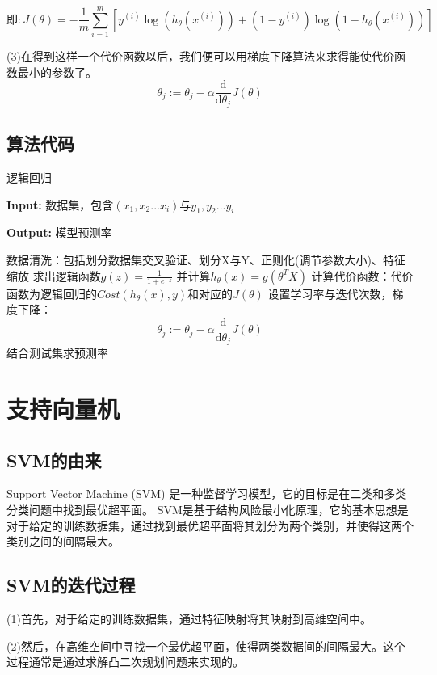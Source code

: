 \documentclass[supercite]{Experimental_Report}
\theoremstyle{definition}
\begin{document}
$$
即:  J(\theta)=-\frac{1}{m} \sum_{i=1}^{m}\left[y^{(i)} \log \left(h_{\theta}\left(x^{(i)}\right)\right)+\left(1-y^{(i)}\right) \log \left(1-h_{\theta}\left(x^{(i)}\right)\right)\right] 
$$

(3)在得到这样一个代价函数以后，我们便可以用梯度下降算法来求得能使代价函数最小的参数了。
 $$ \theta_j:= \theta_j-α\frac{\mathrm{d}}{\mathrm{d}\theta_j}J(\theta) 
$$

\clearpage
\subsection{算法代码}
\begin{algorithm}[htb]
\caption{逻辑回归}
\label{alg:F4}
\hspace*{0.02in} {\bf Input:}
数据集，包含$(x_1,x_2...x_i)$与$y_1,y_2...y_i$

\hspace*{0.02in} {\bf Output:} 模型预测率
  \begin{algorithmic}[1]
    \State
        数据清洗：包括划分数据集交叉验证、划分X与Y、正则化(调节参数大小)、特征缩放
    \State
        求出逻辑函数$g(z)=\frac{1}{1+e^{-z}}$
        并计算$h_\theta(x)=g(\theta^TX)$
    \State
        计算代价函数：代价函数为逻辑回归的$Cost(h_\theta(x),y)$和对应的$J(\theta)$
    \State
        设置学习率与迭代次数，梯度下降：
        $$ \theta_j:= \theta_j-α\frac{\mathrm{d}}{\mathrm{d}\theta_j}J(\theta) 
        $$
    \State
        结合测试集求预测率
  \end{algorithmic}
\end{algorithm}
\clearpage
\section{支持向量机}
\subsection{SVM的由来}
Support Vector Machine (SVM) 是一种监督学习模型，它的目标是在二类和多类分类问题中找到最优超平面。 SVM是基于结构风险最小化原理，它的基本思想是对于给定的训练数据集，通过找到最优超平面将其划分为两个类别，并使得这两个类别之间的间隔最大。
\subsection{SVM的迭代过程}
(1)首先，对于给定的训练数据集，通过特征映射将其映射到高维空间中。

(2)然后，在高维空间中寻找一个最优超平面，使得两类数据间的间隔最大。这个过程通常是通过求解凸二次规划问题来实现的。
\end{document}

